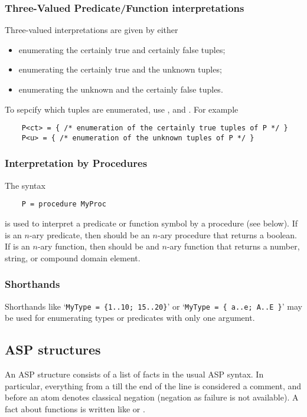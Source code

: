 \documentclass[a4]{article}
\begin{document}
\subsubsection{Three-Valued Predicate/Function interpretations}
Three-valued interpretations are given by either
\begin{itemize}
	\item enumerating the certainly true and certainly false tuples;
	\item enumerating the certainly true and the unknown tuples;
	\item enumerating the unknown and the certainly false tuples.
\end{itemize}
To sepcify which tuples are enumerated, use ,  and .  For example
\begin{lstlisting}
	P<ct> = { /* enumeration of the certainly true tuples of P */ }
	P<u> = { /* enumeration of the unknown tuples of P */ }
\end{lstlisting}

\subsubsection{Interpretation by Procedures}
The syntax 
\begin{lstlisting}
	P = procedure MyProc
\end{lstlisting}
is used to interpret a predicate or function symbol  by a procedure  (see below).  If  is an $n$-ary predicate, then  should be an $n$-ary procedure that returns a boolean.  If  is an $n$-ary function, then  should be and $n$-ary function that returns a number, string, or compound domain element.


\subsubsection{Shorthands}
Shorthands like `{\tt MyType = \{1..10; 15..20\}}' or `{\tt MyType = \{ a..e; A..E \}}' may be used for enumerating types or predicates with only one argument.



\subsection{ASP structures}
An ASP structure consists of a list of facts in the usual ASP syntax.  In particular, everything from a \code{\%} till the end of the line is considered a comment, and \code{-} before an atom denotes classical negation (negation as failure is not available).  A fact about functions is written like  or .
\end{document}
